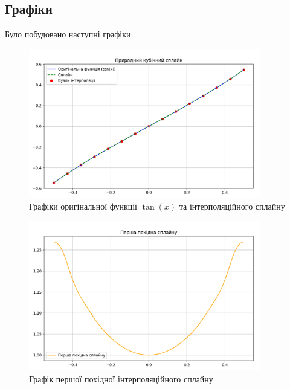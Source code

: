 \documentclass[a4paper, 12pt]{article}
\begin{document}
\newpage
\subsection{Графіки}
Було побудовано наступні графіки:

\begin{figure}[h!]
    \centering
    \includegraphics[width=0.9\textwidth]{spline_plot.png}
    \caption{Графіки оригінальної функції \( \tan(x) \) та інтерполяційного сплайну}
    \label{fig:spline}
\end{figure}

\begin{figure}[h!]
    \centering
    \includegraphics[width=0.9\textwidth]{first_der.png}
    \caption{Графік першої похідної інтерполяційного сплайну}
    \label{fig:first_der}
\end{figure}
\end{document}
